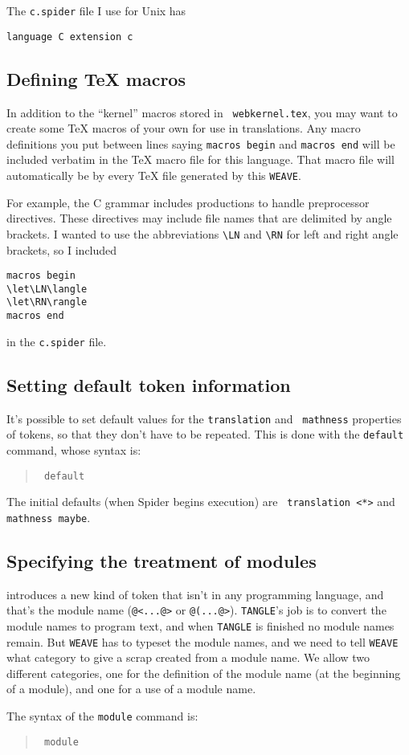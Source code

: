 The {\tt c.spider} file I use for Unix has
\begin{verbatim}
language C extension c
\end{verbatim}


\subsection{Defining {\TeX} macros}
In addition to the ``kernel'' {\WEB} macros stored in {\tt
webkernel.tex}, you may want to create some {\TeX} macros of your
own for use in translations.
Any macro definitions you put between lines saying {\tt macros begin}
and {\tt macros end} will be included verbatim in the {\TeX} macro
file for this language.
That macro  file will automatically be \verb++ by every {\TeX}
file generated by this {\tt WEAVE}.

For example, the C grammar includes productions to handle preprocessor
directives.
These  directives may include file names that are delimited by angle
brackets.
I wanted to use the abbreviations \verb+\LN+ and \verb+\RN+ for left
and right angle brackets, so I included
\begin{verbatim}
macros begin
\let\LN\langle
\let\RN\rangle
macros end
\end{verbatim}
in the {\tt c.spider} file.

\subsection{Setting default token information}
It's possible to set default values for the {\tt translation} and {\tt
mathness} properties of tokens, so that they don't have to be
repeated.
This is done with the {\tt default} command, whose syntax is:
\begin{quote}
\tt
default 
\end{quote}
The initial defaults (when {Spider} begins execution) are {\tt
translation~<*>} and {\tt mathness~maybe}.

\subsection{Specifying the treatment of modules}
{\WEB} introduces a new kind of token that isn't in any programming
language, and that's the module name ({\tt @<...@>} or {\tt @(...@>}).
{\tt TANGLE}'s job is to convert the module names to program text, and
when {\tt TANGLE} is finished no module names remain.
But {\tt WEAVE} has to typeset the module names, and we need to tell
{\tt WEAVE} what category to give a scrap created from a module name.
We allow two different categories, one for the definition of the
module name (at the beginning of a module), and one for a use of a
module name.
{\samepage
The syntax of the {\tt module} command is:
\begin{quote}
\tt
module  
\end{quote}
}

